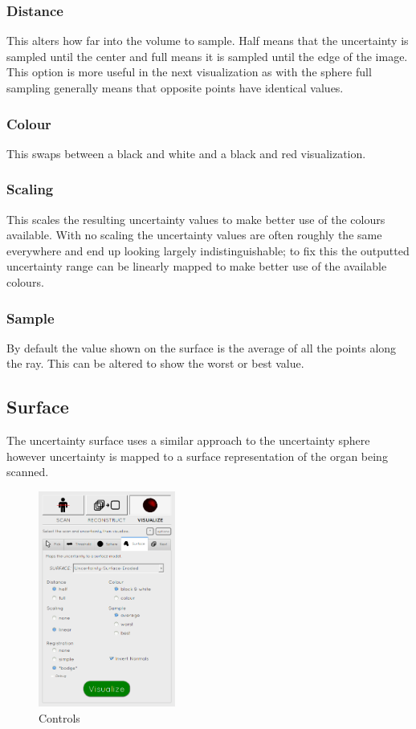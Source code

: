 \subsubsection{Distance}
This alters how far into the volume to sample. Half means that the uncertainty is sampled until the center and full means it is sampled until the edge of the image. This option is more useful in the next visualization as with the sphere full sampling generally means that opposite points have identical values.

\subsubsection{Colour}
This swaps between a black and white and a black and red visualization.

\subsubsection{Scaling}
This scales the resulting uncertainty values to make better use of the colours available. With no scaling the uncertainty values are often roughly the same everywhere and end up looking largely indistinguishable; to fix this the outputted uncertainty range can be linearly mapped to make better use of the available colours.

\subsubsection{Sample}
By default the value shown on the surface is the average of all the points along the ray. This can be altered to show the worst or best value.

\clearpage
\subsection{Surface}\label{implementation:surface}
The uncertainty surface uses a similar approach to the uncertainty sphere however uncertainty is mapped to a surface representation of the organ being scanned.

\begin{figure}
  \vspace{-20pt}
  \includegraphics[width=0.4\textwidth]{images/tool/4_surface.png}
  \caption{Controls}\label{fig:surface_settings}
\end{figure}

